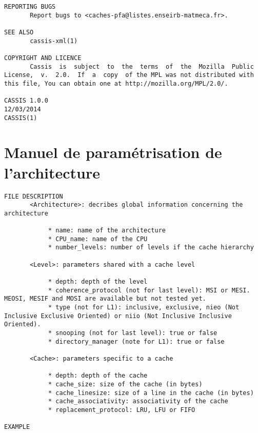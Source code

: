 \begin{lstlisting}[style=styleMan]
REPORTING BUGS
       Report bugs to <caches-pfa@listes.enseirb-matmeca.fr>.

SEE ALSO
       cassis-xml(1)

COPYRIGHT AND LICENCE
       Cassis  is  subject  to  the  terms  of  the  Mozilla  Public  License,  v.  2.0.  If  a  copy  of the MPL was not distributed with this file, You can obtain one at http://mozilla.org/MPL/2.0/.

CASSIS 1.0.0                                                                                                  12/03/2014                                                                                                     CASSIS(1)
\end{lstlisting}
\newpage
\section{Manuel de paramétrisation de l'architecture}
\label{manarchi}
\begin{lstlisting}[style=styleMan]
FILE DESCRIPTION
       <Architecture>: decribes global information concerning the architecture

            * name: name of the architecture
            * CPU_name: name of the CPU
            * number_levels: number of levels if the cache hierarchy

       <Level>: parameters shared with a cache level

            * depth: depth of the level
            * coherence_protocol (not for last level): MSI or MESI. MEOSI, MESIF and MOSI are available but not tested yet.
            * type (not for L1): inclusive, exclusive, nieo (Not Inclusive Exclusive Oriented) or niio (Not Inclusive Inclusive Oriented).
            * snooping (not for last level): true or false
            * directory_manager (note for L1): true or false

       <Cache>: parameters specific to a cache

            * depth: depth of the cache
            * cache_size: size of the cache (in bytes)
            * cache_linesize: size of a line in the cache (in bytes)
            * cache_associativity: associativity of the cache
            * replacement_protocol: LRU, LFU or FIFO

EXAMPLE
\end{lstlisting}
